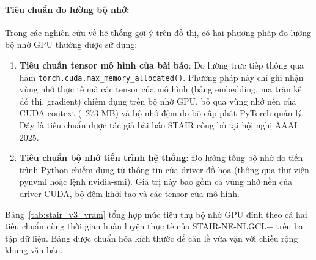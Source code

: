 \paragraph{Tiêu chuẩn đo lường bộ nhớ:}
Trong các nghiên cứu về hệ thống gợi ý trên đồ thị, có hai phương pháp đo lường bộ nhớ GPU thường được sử dụng:
\begin{enumerate}[leftmargin=*]
    \item \textbf{Tiêu chuẩn tensor mô hình của bài báo}: Đo lường trực tiếp thông qua hàm \texttt{torch.cuda.max\_memory\_allocated()}. Phương pháp này chỉ ghi nhận vùng nhớ thực tế mà các tensor của mô hình (bảng embedding, ma trận kề đồ thị, gradient) chiếm dụng trên bộ nhớ GPU, bỏ qua vùng nhớ nền của CUDA context (~273 MB) và bộ nhớ đệm do bộ cấp phát PyTorch quản lý. Đây là tiêu chuẩn được tác giả bài báo STAIR công bố tại hội nghị AAAI 2025.
    \item \textbf{Tiêu chuẩn bộ nhớ tiến trình hệ thống}: Đo lường tổng bộ nhớ do tiến trình Python chiếm dụng từ thông tin của driver đồ họa (thông qua thư viện pynvml hoặc lệnh nvidia-smi). Giá trị này bao gồm cả vùng nhớ nền của driver CUDA, bộ đệm khởi tạo và các tensor của mô hình.
\end{enumerate}

Bảng~\ref{tab:stair_v3_vram} tổng hợp mức tiêu thụ bộ nhớ GPU đỉnh theo cả hai tiêu chuẩn cùng thời gian huấn luyện thực tế của STAIR-NE-NLGCL+ trên ba tập dữ liệu. Bảng được chuẩn hóa kích thước để căn lề vừa vặn với chiều rộng khung văn bản.

\begin{table}[H]
\centering
\small
\setlength{\tabcolsep}{4.5pt}
\renewcommand{\arraystretch}{1.15}
\caption{Mức tiêu thụ bộ nhớ GPU VRAM đỉnh và thời gian huấn luyện thực tế của STAIR-NE-NLGCL+ trên GPU Tesla T4 (16 GB).}
\label{tab:stair_v3_vram}
\end{table}

